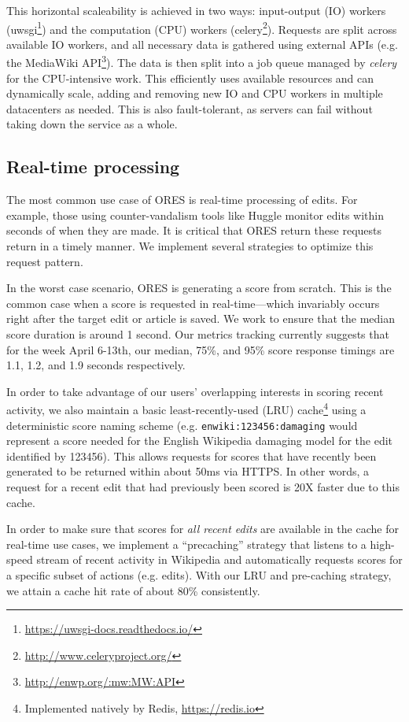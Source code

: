 This horizontal scaleability is achieved in two ways: input-output (IO) workers (uwsgi\footnote{\url{https://uwsgi-docs.readthedocs.io/}}) and the computation (CPU) workers (celery\footnote{\url{http://www.celeryproject.org/}}).  Requests are split across available IO workers, and all necessary data is gathered using external APIs (e.g. the MediaWiki API\footnote{\url{http://enwp.org/:mw:MW:API}}).  The data is then split into a job queue managed by \emph{celery} for the CPU-intensive work.  This efficiently uses available resources and can dynamically scale, adding and removing new IO and CPU workers in multiple datacenters as needed.  This is also fault-tolerant, as servers can fail without taking down the service as a whole.

\subsection{Real-time processing}
The most common use case of ORES is real-time processing of edits.  For example, those using counter-vandalism tools like Huggle monitor edits within seconds of when they are made.  It is critical that ORES return these requests return in a timely manner.  We implement several strategies to optimize this request pattern.

In the worst case scenario, ORES is generating a score from scratch.  This is the common case when a score is requested in real-time---which invariably occurs right after the target edit or article is saved.  We work to ensure that the median score duration is around 1 second.  Our metrics tracking currently suggests that for the week April 6-13th, our median, 75\%, and 95\% score response timings are 1.1, 1.2, and 1.9 seconds respectively.

In order to take advantage of our users' overlapping interests in scoring recent activity, we also maintain a basic least-recently-used (LRU) cache\footnote{Implemented natively by Redis, \url{https://redis.io}} using a deterministic score naming scheme (e.g. \texttt{enwiki:123456:damaging} would represent a score needed for the English Wikipedia damaging model for the edit identified by 123456).  This allows requests for scores that have recently been generated to be returned within about 50ms via HTTPS.  In other words, a request for a recent edit that had previously been scored is 20X faster due to this cache.

In order to make sure that scores for \emph{all recent edits} are available in the cache for real-time use cases, we implement a ``precaching'' strategy that listens to a high-speed stream of recent activity in Wikipedia and automatically requests scores for a specific subset of actions (e.g. edits).  With our LRU and pre-caching strategy, we attain a cache hit rate of about 80\% consistently.


